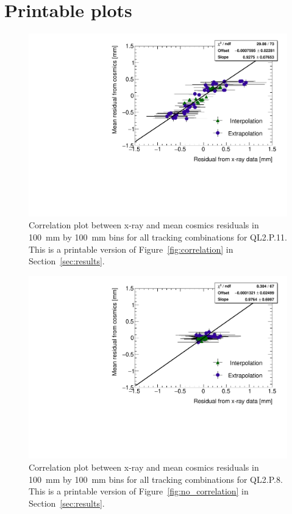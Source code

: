 
\chapter[Printable plots]{Printable plots}
\label{appendix:print}

\begin{figure}
    \centering
    \includegraphics[width = \textwidth]{figures/figure_QL2P11_3100V_2021-08-05_QL2P11_local_cosmic_and_xray_data_correlation_plot_printable.pdf}
    \caption{Correlation plot between x-ray and mean cosmics residuals in \SI{100}{mm} by \SI{100}{mm} bins for all tracking combinations for QL2.P.11. This is a printable version of Figure~\ref{fig:correlation} in Section~\ref{sec:results}.}
    \label{fig:correlation_print}
\end{figure}

\begin{figure}
    \centering
    \includegraphics[width = \textwidth]{figures/figure_QL2P08_3100V_2021-08-16_QL2P08_local_cosmic_and_xray_data_correlation_plot_printable.pdf}
    \caption{Correlation plot between x-ray and mean cosmics residuals in \SI{100}{mm} by \SI{100}{mm} bins for all tracking combinations for QL2.P.8. This is a printable version of Figure~\ref{fig:no_correlation} in Section~\ref{sec:results}.}
    \label{fig:no_correlation_print}
\end{figure}
